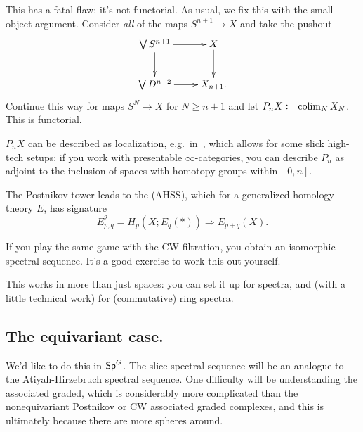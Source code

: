 This has a fatal flaw: it's not functorial. As usual, we fix this with the small object argument. Consider
\emph{all} of the maps $S^{n+1}\to X$ and take the pushout
\[\xymatrix{
	\bigvee S^{n+1}\ar[r]\ar[d] & X\ar[d]\\
	\bigvee D^{n+2}\ar[r] & X_{n+1}.
}\]
Continue this way for maps $S^N\to X$ for $N\ge n+1$ and let $P_nX\coloneqq \operatorname*{colim}_N X_N$. This is functorial.

$P_nX$ can be described as localization, e.g.\ in~\cite{MandellShipley}, which allows for some slick high-tech
setups: if you work with presentable $\infty$-categories, you can describe $P_n$ as adjoint to the inclusion of
spaces with homotopy groups within $[0,n]$.

The Postnikov tower leads to the  (AHSS), which for a generalized
homology theory $E$, has signature
\[E_{p,q}^2 = H_p(X; E_q(*))\Longrightarrow E_{p+q}(X).\]
\begin{ex}
If you play the same game with the CW filtration, you obtain an isomorphic spectral sequence. It's a good exercise
to work this out yourself.
\end{ex}
This works in more than just spaces: you can set it up for spectra, and (with a little technical work) for
(commutative) ring spectra.
\subsection*{The equivariant case.}
We'd like to do this in $\mathsf{Sp}^G$. The slice spectral sequence will be an analogue to the Atiyah-Hirzebruch spectral
sequence. One difficulty will be understanding the associated graded, which is considerably more complicated than
the nonequivariant Postnikov or CW associated graded complexes, and this is ultimately because there are more
spheres around.

